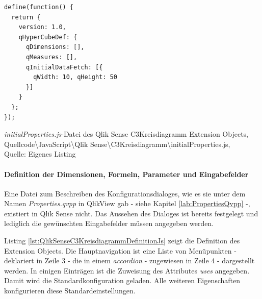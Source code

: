 \ifIncludeFigures\begin{listing}[htbp]
\begin{verbatim}
define(function() {
  return {
    version: 1.0,
    qHyperCubeDef: {
      qDimensions: [],
      qMeasures: [],
      qInitialDataFetch: [{
        qWidth: 10, qHeight: 50
      }]
    }
  };
});
\end{verbatim}
\caption[\textit{initialProperties.js}-Datei des Qlik Sense C3Kreisdiagramm Extension Objects]{\textit{initialProperties.js}-Datei des Qlik Sense C3Kreisdiagramm Extension Objects, \\Quellcode\textbackslash{}JavaScript\textbackslash{}Qlik Sense\textbackslash{}C3Kreisdiagramm\textbackslash{}initialProperties.js, \\Quelle: Eigenes Listing}
\label{lst:QlikSenseC3KreisdiagrammInitialPropertiesJs}
\end{listing}\fi

\paragraph{Definition der Dimensionen, Formeln, Parameter und Eingabefelder}

Eine Datei zum Beschreiben des Konfigurationsdialoges, wie es sie unter dem Namen \textit{Properties.qvpp} in QlikView gab - siehe Kapitel \ref{lab:PropertiesQvpp} -, existiert in Qlik Sense nicht. Das Aussehen des Dialoges ist bereits festgelegt und lediglich die gewünschten Eingabefelder müssen angegeben werden.

Listing \ref{lst:QlikSenseC3KreisdiagrammDefinitionJs} zeigt die Definition des Extension Objects. Die Hauptnavigation ist eine Liste von Menüpunkten - deklariert in Zeile 3 - die in einem \textit{accordion} - zugewiesen in Zeile 4 - dargestellt werden. In einigen Einträgen ist die Zuweisung des Attributes \textit{uses} angegeben. Damit wird die Standardkonfiguration geladen. Alle weiteren Eigenschaften konfigurieren diese Standardeinstellungen.

